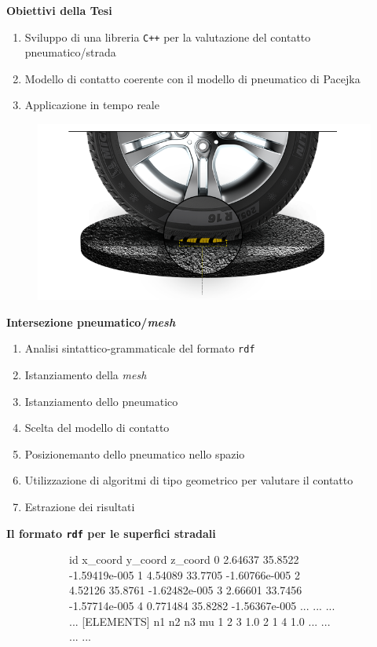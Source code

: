\documentclass[xcolor=dvipsnames]{beamer} %
\begin{document}
\begin{frame}
	\Large{\textbf{Obiettivi della Tesi}}
	\normalsize
	\begin{enumerate}
		\item Sviluppo di una libreria \texttt{C++} per la valutazione del contatto pneumatico/strada 
		\item Modello di contatto coerente con il modello di pneumatico di Pacejka
		\item Applicazione in tempo reale
	\end{enumerate}
	\begin{figure}
		\centering
		\includegraphics[width=0.6\linewidth]{../Figures/contact}
	\end{figure}
\end{frame}

\begin{frame}
	\Large{\textbf{Intersezione pneumatico/\textit{mesh}}}
	\normalsize
	\begin{enumerate}
		\item Analisi sintattico-grammaticale del formato \texttt{rdf}
		\item Istanziamento della \textit{mesh}
		\item Istanziamento dello pneumatico
		\item Scelta del modello di contatto
		\item Posizionemanto dello pneumatico nello spazio
		\item Utilizzazione di algoritmi di tipo geometrico per valutare il contatto
		\item Estrazione dei risultati
	\end{enumerate}
\end{frame}

\begin{frame}[fragile]
	\Large{\textbf{Il formato \texttt{rdf} per le superfici stradali}}
	\normalsize
	\begin{figure}
		\centering
		\begin{subfigure}{\linewidth}
\begin{pseudoc}
[NODES]
{ id x_coord y_coord z_coord }
0 2.64637 35.8522 -1.59419e-005 
1 4.54089 33.7705 -1.60766e-005 
2 4.52126 35.8761 -1.62482e-005 
3 2.66601 33.7456 -1.57714e-005 
4 0.771484 35.8282 -1.56367e-005 
... ... ... ...
[ELEMENTS]
{ n1 n2 n3 mu }
1 2 3 1.0 
2 1 4 1.0 
... ... ... ...
\end{pseudoc}
		\end{subfigure}
	\end{figure}
\end{frame}
\end{document}
